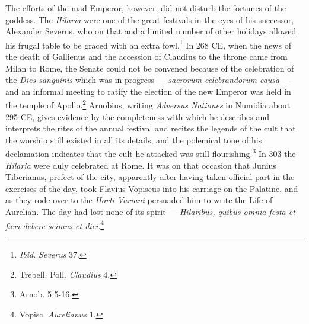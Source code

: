 \documentclass[a4paper, 11pt, oneside, polutonikogreek, french]{article}
\begin{document}
The efforts of the mad Emperor, however, did not disturb the fortunes of the goddess. The \emph{Hilaria} were one of the great festivals in the eyes of his successor, Alexander Severus, who on that and a limited number of other holidays allowed his frugal table to be graced with an extra fowl.\footnote{\emph{Ibid.} \emph{Severus} 37.} In 268 \textsc{CE}, when the news of the death of Gallienus and the accession of Claudius to the throne came from Milan to Rome, the Senate could not be convened because of the celebration of the \emph{Dies sanguinis} which was in progress --- \emph{sacrorum celebrandorum causa} --- and an informal meeting to ratify the election of the new Emperor was held in the temple of Apollo.\footnote{Trebell. Poll. \emph{Claudius} 4.} Arnobius, writing \emph{Adversus Nationes} in Numidia about 295 \textsc{CE}, gives evidence by the completeness with which he describes and interprets the rites of the annual festival and recites the legends of the cult that the worship still existed in all its details, and the polemical tone of his declamation indicates that the cult he attacked was still flourishing.\footnote{Arnob. 5 5-16.} In 303 the \emph{Hilaria} were duly celebrated at Rome. It was on that occasion that Junius Tiberianus, prefect of the city, apparently after having taken official part in the exercises of the day, took Flavius Vopiscus into his carriage on the Palatine, and as they rode over to the \emph{Horti Variani} persuaded him to write the Life of Aurelian. The day had lost none of its spirit --- \emph{Hilaribus, quibus omnia festa et fieri debere scimus et dici}.\footnote{Vopisc. \emph{Aurelianus} 1.}
\end{document}
